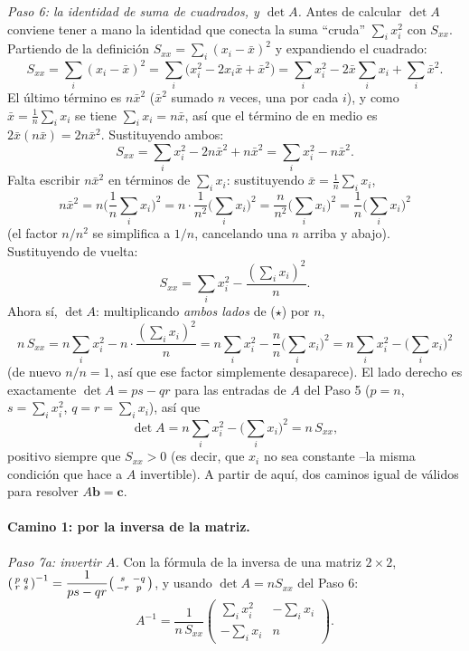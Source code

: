 \documentclass[11pt,a4paper,oneside]{article}
\theoremstyle{plain}
\theoremstyle{definition}
\begin{document}
\emph{Paso 6: la identidad de suma de cuadrados, y $\det A$.} Antes de
calcular $\det A$ conviene tener a mano la identidad que conecta la suma
``cruda'' $\sum_ix_i^2$ con $S_{xx}$. Partiendo de la definición
$S_{xx}=\sum_i(x_i-\bar x)^2$ y expandiendo el cuadrado:
\[
  S_{xx}=\sum_i(x_i-\bar x)^2 = \sum_i\big(x_i^2-2x_i\bar x+\bar x^2\big)
  = \sum_ix_i^2 - 2\bar x\sum_ix_i + \sum_i\bar x^2 .
\]
El último término es $n\bar x^2$ ($\bar x^2$ sumado $n$ veces, una por
cada $i$), y como $\bar x=\frac1n\sum_ix_i$ se tiene
$\sum_ix_i=n\bar x$, así que el término de en medio es
$2\bar x(n\bar x)=2n\bar x^2$. Sustituyendo ambos:
\[
  S_{xx} = \sum_ix_i^2 - 2n\bar x^2+n\bar x^2 = \sum_ix_i^2-n\bar x^2 .
\]
Falta escribir $n\bar x^2$ en términos de $\sum_ix_i$: sustituyendo
$\bar x=\frac1n\sum_ix_i$,
\[
  n\bar x^2 = n\Big(\frac1n\sum_ix_i\Big)^{\!2}
  = n\cdot\frac{1}{n^2}\Big(\sum_ix_i\Big)^2
  = \frac{n}{n^2}\Big(\sum_ix_i\Big)^2
  = \frac1n\Big(\sum_ix_i\Big)^2
\]
(el factor $n/n^2$ se simplifica a $1/n$, cancelando una $n$ arriba y
abajo). Sustituyendo de vuelta:
\[
  S_{xx} = \sum_ix_i^2 - \frac{(\sum_ix_i)^2}{n}. \tag{$\star$}
\]
Ahora sí, $\det A$: multiplicando \emph{ambos lados} de ($\star$) por
$n$,
\[
  n\,S_{xx} = n\sum_ix_i^2 - n\cdot\frac{(\sum_ix_i)^2}{n}
  = n\sum_ix_i^2-\frac{n}{n}\Big(\sum_ix_i\Big)^2
  = n\sum_ix_i^2-\Big(\sum_ix_i\Big)^2
\]
(de nuevo $n/n=1$, así que ese factor simplemente desaparece). El lado
derecho es exactamente $\det A = ps-qr$ para las entradas de $A$ del
Paso 5 ($p=n$, $s=\sum_ix_i^2$, $q=r=\sum_ix_i$), así que
\[
  \det A = n\sum_ix_i^2-\Big(\sum_ix_i\Big)^2 = n\,S_{xx},
\]
positivo siempre que $S_{xx}>0$ (es decir, que $x_i$ no sea constante
--la misma condición que hace a $A$ invertible). A partir de aquí, dos
caminos igual de válidos para resolver $A\mathbf b=\mathbf c$.

\paragraph{Camino 1: por la inversa de la matriz.}

\emph{Paso 7a: invertir $A$.} Con la fórmula de la inversa de una matriz
$2\times2$,
$\begin{psmallmatrix}p&q\\r&s\end{psmallmatrix}^{-1}
=\dfrac1{ps-qr}\begin{psmallmatrix}s&-q\\-r&p\end{psmallmatrix}$, y
usando $\det A=nS_{xx}$ del Paso 6:
\[
  A^{-1}=\frac1{n\,S_{xx}}
  \begin{pmatrix}\displaystyle\sum_ix_i^2 & -\displaystyle\sum_ix_i \\[4pt]
  -\displaystyle\sum_ix_i & n\end{pmatrix}.
\]
\end{document}
